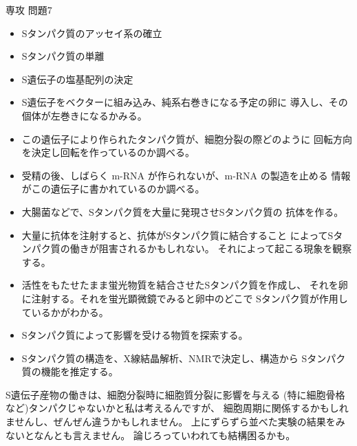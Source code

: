 \documentclass[fleqn]{jbook}
\begin{document}
\begin{answer}{専攻 問題7}{}
\begin{subanswers}
\SubAnswer
  \begin{itemize}
  \item
    Sタンパク質のアッセイ系の確立
  \item
    Sタンパク質の単離
  \item
    S遺伝子の塩基配列の決定
  \item
    S遺伝子をベクターに組み込み、純系右巻きになる予定の卵に
    導入し、その個体が左巻きになるかみる。
  \item 
    この遺伝子により作られたタンパク質が、細胞分裂の際どのように
    回転方向を決定し回転を作っているのか調べる。
  \item
    受精の後、しばらく m-RNA が作られないが、m-RNA の製造を止める
    情報がこの遺伝子に書かれているのか調べる。
  \item
    大腸菌などで、Sタンパク質を大量に発現させSタンパク質の
    抗体を作る。
  \item
    大量に抗体を注射すると、抗体がSタンパク質に結合すること
    によってSタンパク質の働きが阻害されるかもしれない。
    それによって起こる現象を観察する。
  \item
    活性をもたせたまま蛍光物質を結合させたSタンパク質を作成し、
    それを卵に注射する。それを蛍光顕微鏡でみると卵中のどこで
    Sタンパク質が作用しているかがわかる。
  \item
    Sタンパク質によって影響を受ける物質を探索する。
  \item
    Sタンパク質の構造を、X線結晶解析、NMRで決定し、構造から
    Sタンパク質の機能を推定する。
  \end{itemize}

  S遺伝子産物の働きは、細胞分裂時に細胞質分裂に影響を与える
  (特に細胞骨格など)タンパクじゃないかと私は考えるんですが、
  細胞周期に関係するかもしれませんし、ぜんぜん違うかもしれません。
  上にずらずら並べた実験の結果をみないとなんとも言えません。
  論じろっていわれても結構困るかも。

\end{subanswers}
\end{answer}
\end{document}
